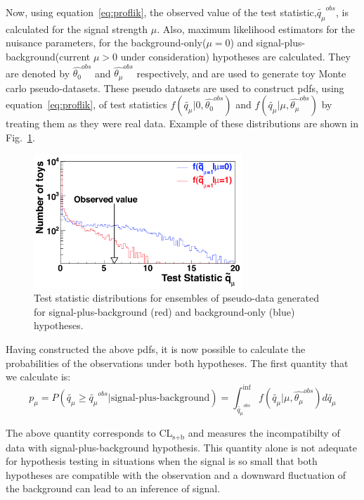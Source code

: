 Now, using equation~\ref{eq:proflik}, the observed value of the test statistic,$\tilde{q_\mu}^{obs}$, is calculated for the signal strength $\mu$. Also, maximum likelihood estimators for the nuisance parameters, for the background-only($\mu=0$) and signal-plus-background(current $\mu>0$ under consideration) hypotheses are calculated. They are denoted by $\hat{\theta_{0}}^{obs}$ and $\hat{\theta_\mu}^{obs}$ respectively, and are used to generate toy Monte carlo pseudo-datasets. These pseudo datasets are used to construct  pdfs, using equation~\ref{eq:proflik}, of test statistics $f(\tilde{q_\mu}|0,\hat{\theta_{0}}^{obs})$ and $f(\tilde{q_\mu}|\mu,\hat{\theta_\mu}^{obs})$ by treating them as they were real data. Example of these distributions are shown in Fig.~\ref{fig:test_stat_dist}.
\begin{figure}[!htpb]\centering
 \includegraphics[width=0.70\textwidth]{plots_and_figures/chapter7/test_statistic_distri.png}
 \caption{Test statistic distributions for ensembles of pseudo-data generated for signal-plus-background (red) and background-only (blue) hypotheses.~\cite{note2011}}
 \label{fig:test_stat_dist}
\end{figure}


Having constructed the above pdfs, it is now possible to calculate the probabilities of the observations under both hypotheses. The first quantity that we calculate is:
\begin{equation}                                                                                                                                                                                                 \label{eq:pmu}                                                       p_\mu=P(\tilde{q_\mu}\geq \tilde{q_\mu}^{obs}|\text{signal-plus-background})=\int_{\tilde{q_\mu}^{obs}}^{\inf}f(\tilde{q_\mu}|\mu,\hat{\theta_\mu}^{obs})d\tilde{q_\mu}
\end{equation}

The above quantity corresponds to CL$_\text{s+b}$ and measures the incompatibilty of data with signal-plus-background hypothesis. This quantity alone is not adequate for hypothesis testing in situations when the signal is so small that both hypotheses are compatible with the observation and a downward fluctuation of the background can lead to an inference of signal.

